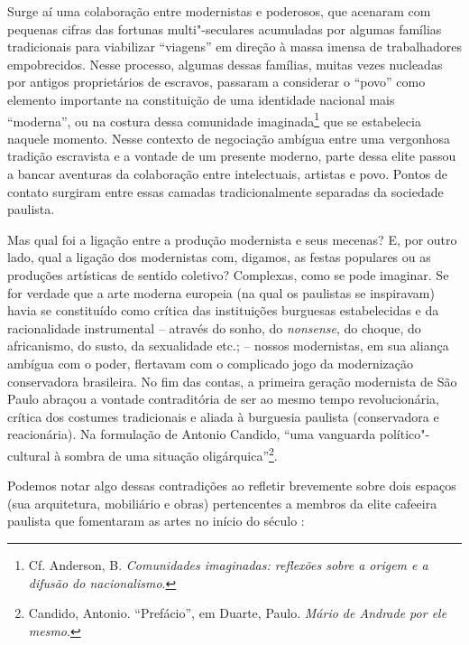 Surge aí uma colaboração entre modernistas e poderosos, que acenaram com
pequenas cifras das fortunas multi"-seculares acumuladas por algumas
famílias tradicionais para viabilizar ``viagens'' em direção à massa
imensa de trabalhadores empobrecidos. Nesse processo, algumas dessas
famílias, muitas vezes nucleadas por antigos proprietários de escravos,
passaram a considerar o ``povo'' como elemento importante na
constituição de uma identidade nacional mais ``moderna'', ou na costura
dessa comunidade imaginada\footnote{Cf. Anderson, B. \emph{Comunidades
  imaginadas: reflexões sobre a origem e a difusão do nacionalismo}.}
que se estabelecia naquele momento. Nesse contexto de negociação ambígua
entre uma vergonhosa tradição escravista e a vontade de um presente
moderno, parte dessa elite passou a bancar aventuras da colaboração
entre intelectuais, artistas e povo. Pontos de contato surgiram entre
essas camadas tradicionalmente separadas da sociedade paulista.

Mas qual foi a ligação entre a produção modernista e seus mecenas? E,
por outro lado, qual a ligação dos modernistas com, digamos, as festas
populares ou as produções artísticas de sentido coletivo? Complexas,
como se pode imaginar. Se for verdade que a arte moderna europeia (na
qual os paulistas se inspiravam) havia se constituído como crítica das
instituições burguesas estabelecidas e da racionalidade instrumental --
através do sonho, do \emph{nonsense}, do choque, do africanismo, do
susto, da sexualidade etc.; -- nossos modernistas, em sua aliança
ambígua com o poder, flertavam com o complicado jogo da modernização
conservadora brasileira. No fim das contas, a primeira geração
modernista de São Paulo abraçou a vontade contraditória de ser ao mesmo
tempo revolucionária, crítica dos costumes tradicionais e aliada à
burguesia paulista (conservadora e reacionária). Na formulação de
Antonio Candido, ``uma vanguarda político"-cultural à sombra de uma
situação oligárquica''\footnote{Candido, Antonio. ``Prefácio'', em
  Duarte, Paulo. \emph{Mário de Andrade por ele mesmo}.}.

Podemos notar algo dessas contradições ao refletir brevemente sobre dois
espaços (sua arquitetura, mobiliário e obras) pertencentes a membros da
elite cafeeira paulista que fomentaram as artes no início do século :

